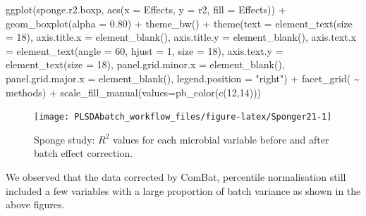 \documentclass[
]{book}
\newenvironment{Shaded}{\begin{snugshade}}{\end{snugshade}}
\newcommand{\AttributeTok}[1]{\textcolor[rgb]{0.77,0.63,0.00}{#1}}
\newcommand{\DecValTok}[1]{\textcolor[rgb]{0.00,0.00,0.81}{#1}}
\newcommand{\FloatTok}[1]{\textcolor[rgb]{0.00,0.00,0.81}{#1}}
\newcommand{\FunctionTok}[1]{\textcolor[rgb]{0.00,0.00,0.00}{#1}}
\newcommand{\NormalTok}[1]{#1}
\newcommand{\SpecialCharTok}[1]{\textcolor[rgb]{0.00,0.00,0.00}{#1}}
\newcommand{\StringTok}[1]{\textcolor[rgb]{0.31,0.60,0.02}{#1}}
\begin{document}
\begin{Shaded}
\begin{Highlighting}[]
\FunctionTok{ggplot}\NormalTok{(sponge.r2.boxp, }\FunctionTok{aes}\NormalTok{(}\AttributeTok{x =}\NormalTok{ Effects, }\AttributeTok{y =}\NormalTok{ r2, }\AttributeTok{fill =}\NormalTok{ Effects)) }\SpecialCharTok{+}
  \FunctionTok{geom\_boxplot}\NormalTok{(}\AttributeTok{alpha =} \FloatTok{0.80}\NormalTok{) }\SpecialCharTok{+}
  \FunctionTok{theme\_bw}\NormalTok{() }\SpecialCharTok{+} 
  \FunctionTok{theme}\NormalTok{(}\AttributeTok{text =} \FunctionTok{element\_text}\NormalTok{(}\AttributeTok{size =} \DecValTok{18}\NormalTok{),}
        \AttributeTok{axis.title.x =} \FunctionTok{element\_blank}\NormalTok{(),}
        \AttributeTok{axis.title.y =} \FunctionTok{element\_blank}\NormalTok{(),}
        \AttributeTok{axis.text.x =} \FunctionTok{element\_text}\NormalTok{(}\AttributeTok{angle =} \DecValTok{60}\NormalTok{, }\AttributeTok{hjust =} \DecValTok{1}\NormalTok{, }\AttributeTok{size =} \DecValTok{18}\NormalTok{),}
        \AttributeTok{axis.text.y =} \FunctionTok{element\_text}\NormalTok{(}\AttributeTok{size =} \DecValTok{18}\NormalTok{),}
        \AttributeTok{panel.grid.minor.x =} \FunctionTok{element\_blank}\NormalTok{(),}
        \AttributeTok{panel.grid.major.x =} \FunctionTok{element\_blank}\NormalTok{(),}
        \AttributeTok{legend.position =} \StringTok{"right"}\NormalTok{) }\SpecialCharTok{+} \FunctionTok{facet\_grid}\NormalTok{( }\SpecialCharTok{\textasciitilde{}}\NormalTok{ methods) }\SpecialCharTok{+} 
  \FunctionTok{scale\_fill\_manual}\NormalTok{(}\AttributeTok{values=}\FunctionTok{pb\_color}\NormalTok{(}\FunctionTok{c}\NormalTok{(}\DecValTok{12}\NormalTok{,}\DecValTok{14}\NormalTok{))) }
\end{Highlighting}
\end{Shaded}

\begin{figure}

{\centering \texttt{[image: PLSDAbatch\_workflow\_files/figure-latex/Sponger21-1]} 

}

\caption{Sponge study: $R^2$ values for each microbial variable before and after batch effect correction.}\label{fig:Sponger21}
\end{figure}

We observed that the data corrected by ComBat, percentile normalisation still included a few variables with a large proportion of batch variance as shown in the above figures.
\end{document}
